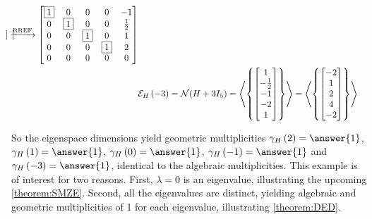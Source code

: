 \documentclass{ximera}
\begin{document}
\begin{example}
\begin{align*}
\begin{bmatrix}
                   \end{bmatrix}
                                         \xrightarrow{\text{RREF}}
                                         \begin{bmatrix}
                                           \fbox{1} & 0 & 0 & 0 & -1\\
                                           0 & \fbox{1} & 0 & 0 & \frac{1}{2}\\
                                           0 & 0 & \fbox{1} & 0 & 1\\
                                           0 & 0 & 0 & \fbox{1} & 2\\
                                           0 & 0 & 0 & 0 & 0
                                         \end{bmatrix}\\
           &\mathcal{E}_{H}\left(-3\right)=\mathcal{N}\!\left(H+3I_5\right)
=\left\langle\left\{\begin{bmatrix}1\\-\frac{1}{2}\\-1\\-2\\1\end{bmatrix}\right\}\right\rangle
    =\left\langle\left\{\begin{bmatrix}-2\\1\\2\\4\\-2\end{bmatrix}\right\}\right\rangle
  \end{align*}


  So the eigenspace dimensions yield geometric multiplicities
  $\geomult{H}{2}=\answer{1}$, $\geomult{H}{1}=\answer{1}$,
  $\geomult{H}{0}=\answer{1}$, $\geomult{H}{-1}=\answer{1}$ and
  $\geomult{H}{-3}=\answer{1}$, identical to the algebraic
  multiplicities.  This example is of interest for two reasons.
  First, $\lambda=0$ is an eigenvalue, illustrating the upcoming
  \ref{theorem:SMZE}.  Second, all the eigenvalues are distinct,
  yielding algebraic and geometric multiplicities of 1 for each
  eigenvalue, illustrating \ref{theorem:DED}.
\end{example}
\end{document}
